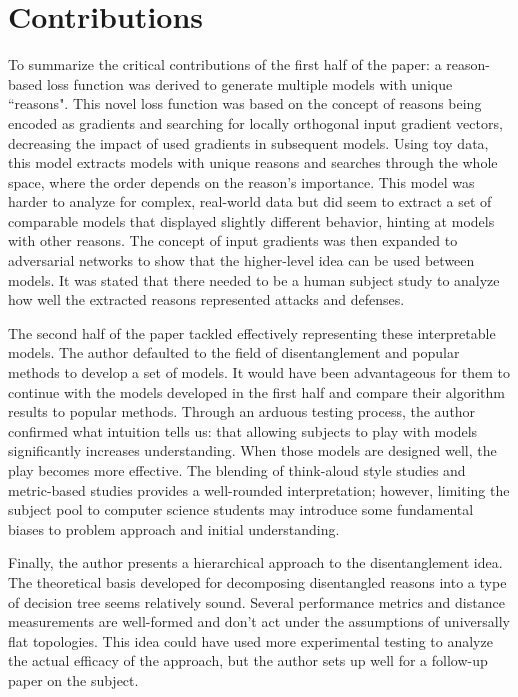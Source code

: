 \documentclass[twoside,11pt]{article}
\begin{document}

\section{Contributions}
\label{sec:contributions}
To summarize the critical contributions of the first half of the paper: a reason-based loss function was derived to generate multiple models with unique ``reasons". This novel loss function was based on the concept of reasons being encoded as gradients and searching for locally orthogonal input gradient vectors, decreasing the impact of used gradients in subsequent models. Using toy data, this model extracts models with unique reasons and searches through the whole space, where the order depends on the reason's importance. This model was harder to analyze for complex, real-world data but did seem to extract a set of comparable models that displayed slightly different behavior, hinting at models with other reasons. The concept of input gradients was then expanded to adversarial networks to show that the higher-level idea can be used between models. It was stated that there needed to be a human subject study to analyze how well the extracted reasons represented attacks and defenses. 

The second half of the paper tackled effectively representing these interpretable models. The author defaulted to the field of disentanglement and popular methods to develop a set of models. It would have been advantageous for them to continue with the models developed in the first half and compare their algorithm results to popular methods. Through an arduous testing process, the author confirmed what intuition tells us: that allowing subjects to play with models significantly increases understanding. When those models are designed well, the play becomes more effective. The blending of think-aloud style studies and metric-based studies provides a well-rounded interpretation; however, limiting the subject pool to computer science students may introduce some fundamental biases to problem approach and initial understanding. 

Finally, the author presents a hierarchical approach to the disentanglement idea. The theoretical basis developed for decomposing disentangled reasons into a type of decision tree seems relatively sound. Several performance metrics and distance measurements are well-formed and don't act under the assumptions of universally flat topologies. This idea could have used more experimental testing to analyze the actual efficacy of the approach, but the author sets up well for a follow-up paper on the subject. 
\end{document}
